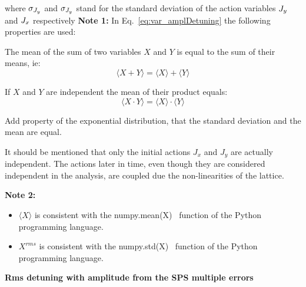 where $\sigma_{{J_y}}$ and $\sigma_{{J_y}}$ stand for the standard deviation of the action variables ${J_y}$ and ${J_x}$ respectively
\textbf{Note 1:} In Eq.~\ref{eq:var_amplDetuning} the following properties are used:

The mean of the sum of two variables $X$ and $Y$ is equal to the sum of their means, ie:
\begin{equation}\label{eq:mean_of_sum_property}
    \langle X+Y \rangle = \langle X \rangle + \langle Y \rangle
\end{equation}

If $X$ and $Y$ are independent the mean of their product equals:
\begin{equation}\label{eq:mean_of_product_property}
    \langle X \cdot Y \rangle = \langle X \rangle \cdot  \langle Y \rangle
\end{equation}

Add property of the exponential distribution, that the standard deviation and the mean are equal.

It should be mentioned that only the initial actions $J_x$ and $J_y$ are actually independent. The actions later in time, even though they are considered independent in the analysis, are coupled due the non-linearities of the lattice.

\textbf{Note 2:}
\begin{itemize}
    \item $\langle X \rangle$ is consistent with the numpy.mean(X)~\cite{numpy_mean} function of the Python programming language.
    \item $X^{rms}$ is consistent with the numpy.std(X)~\cite{numpy_std} function of the Python programming language. 
\end{itemize}



\normalsize{\textbf{Rms detuning with amplitude from the SPS multiple errors}}\\